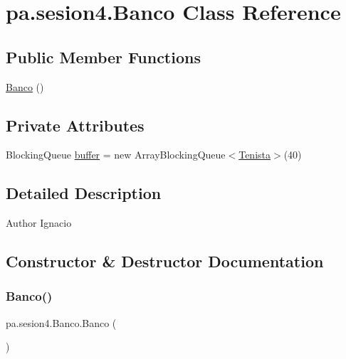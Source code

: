 \hypertarget{classpa_1_1sesion4_1_1_banco}{}\section{pa.\+sesion4.\+Banco Class Reference}
\label{classpa_1_1sesion4_1_1_banco}
\subsection*{Public Member Functions}
\begin{DoxyCompactItemize}
\item 
\mbox{\hyperlink{classpa_1_1sesion4_1_1_banco_a009318b79357862e033cac99e8e9fd4a}{Banco}} ()
\end{DoxyCompactItemize}
\subsection*{Private Attributes}
\begin{DoxyCompactItemize}
\item 
Blocking\+Queue \mbox{\hyperlink{classpa_1_1sesion4_1_1_banco_ad576a676b4e6a14db917766f40349043}{buffer}} = new Array\+Blocking\+Queue$<$\mbox{\hyperlink{classpa_1_1sesion4_1_1_tenista}{Tenista}}$>$(40)
\end{DoxyCompactItemize}


\subsection{Detailed Description}
\begin{DoxyAuthor}{Author}
Ignacio 
\end{DoxyAuthor}


\subsection{Constructor \& Destructor Documentation}
\mbox{\label{classpa_1_1sesion4_1_1_banco_a009318b79357862e033cac99e8e9fd4a}} 
\subsubsection{\texorpdfstring{Banco()}{Banco()}}
{\footnotesize\ttfamily pa.\+sesion4.\+Banco.\+Banco (\begin{DoxyParamCaption}{ }\end{DoxyParamCaption})\hspace{0.3cm}{\ttfamily [inline]}}


